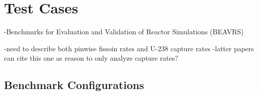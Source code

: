 \section{Test Cases}
\label{sec:Test Cases}

-Benchmarks for Evaluation and Validation of Reactor Simulations (BEAVRS)~\cite{horelik2013beavrs}

-need to describe both pinwise fissoin rates and U-238 capture rates
  -latter papers can cite this one as reason to only analyze capture rates?


\subsection{Benchmark Configurations}
\label{subsec:benchmarks}

